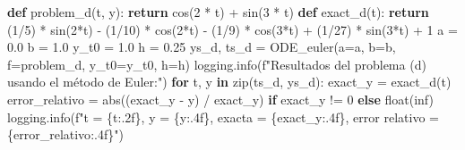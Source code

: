 \documentclass[
  letterpaper,
  DIV=11,
  numbers=noendperiod]{scrartcl}
\newenvironment{Shaded}{\begin{snugshade}}{\end{snugshade}}
\newcommand{\BuiltInTok}[1]{\textcolor[rgb]{0.00,0.23,0.31}{#1}}
\newcommand{\ControlFlowTok}[1]{\textcolor[rgb]{0.00,0.23,0.31}{\textbf{#1}}}
\newcommand{\DecValTok}[1]{\textcolor[rgb]{0.68,0.00,0.00}{#1}}
\newcommand{\FloatTok}[1]{\textcolor[rgb]{0.68,0.00,0.00}{#1}}
\newcommand{\KeywordTok}[1]{\textcolor[rgb]{0.00,0.23,0.31}{\textbf{#1}}}
\newcommand{\NormalTok}[1]{\textcolor[rgb]{0.00,0.23,0.31}{#1}}
\newcommand{\OperatorTok}[1]{\textcolor[rgb]{0.37,0.37,0.37}{#1}}
\newcommand{\SpecialCharTok}[1]{\textcolor[rgb]{0.37,0.37,0.37}{#1}}
\newcommand{\SpecialStringTok}[1]{\textcolor[rgb]{0.13,0.47,0.30}{#1}}
\newcommand{\StringTok}[1]{\textcolor[rgb]{0.13,0.47,0.30}{#1}}
\begin{document}
\begin{Shaded}
\begin{Highlighting}[]
\KeywordTok{def}\NormalTok{ problem\_d(t, y):}
    \ControlFlowTok{return}\NormalTok{ cos(}\DecValTok{2} \OperatorTok{*}\NormalTok{ t) }\OperatorTok{+}\NormalTok{ sin(}\DecValTok{3} \OperatorTok{*}\NormalTok{ t)}
\KeywordTok{def}\NormalTok{ exact\_d(t):}
    \ControlFlowTok{return}\NormalTok{ (}\DecValTok{1}\OperatorTok{/}\DecValTok{5}\NormalTok{) }\OperatorTok{*}\NormalTok{ sin(}\DecValTok{2}\OperatorTok{*}\NormalTok{t) }\OperatorTok{{-}}\NormalTok{ (}\DecValTok{1}\OperatorTok{/}\DecValTok{10}\NormalTok{) }\OperatorTok{*}\NormalTok{ cos(}\DecValTok{2}\OperatorTok{*}\NormalTok{t) }\OperatorTok{{-}}\NormalTok{ (}\DecValTok{1}\OperatorTok{/}\DecValTok{9}\NormalTok{) }\OperatorTok{*}\NormalTok{ cos(}\DecValTok{3}\OperatorTok{*}\NormalTok{t) }\OperatorTok{+}\NormalTok{ (}\DecValTok{1}\OperatorTok{/}\DecValTok{27}\NormalTok{) }\OperatorTok{*}\NormalTok{ sin(}\DecValTok{3}\OperatorTok{*}\NormalTok{t) }\OperatorTok{+} \DecValTok{1}
\NormalTok{a }\OperatorTok{=} \FloatTok{0.0}
\NormalTok{b }\OperatorTok{=} \FloatTok{1.0}
\NormalTok{y\_t0 }\OperatorTok{=} \FloatTok{1.0}
\NormalTok{h }\OperatorTok{=} \FloatTok{0.25}
\NormalTok{ys\_d, ts\_d }\OperatorTok{=}\NormalTok{ ODE\_euler(a}\OperatorTok{=}\NormalTok{a, b}\OperatorTok{=}\NormalTok{b, f}\OperatorTok{=}\NormalTok{problem\_d, y\_t0}\OperatorTok{=}\NormalTok{y\_t0, h}\OperatorTok{=}\NormalTok{h)}
\NormalTok{logging.info(}\SpecialStringTok{f"Resultados del problema (d) usando el método de Euler:"}\NormalTok{)}
\ControlFlowTok{for}\NormalTok{ t, y }\KeywordTok{in} \BuiltInTok{zip}\NormalTok{(ts\_d, ys\_d):}
\NormalTok{    exact\_y }\OperatorTok{=}\NormalTok{ exact\_d(t)}
\NormalTok{    error\_relativo }\OperatorTok{=} \BuiltInTok{abs}\NormalTok{((exact\_y }\OperatorTok{{-}}\NormalTok{ y) }\OperatorTok{/}\NormalTok{ exact\_y) }\ControlFlowTok{if}\NormalTok{ exact\_y }\OperatorTok{!=} \DecValTok{0} \ControlFlowTok{else} \BuiltInTok{float}\NormalTok{(}\StringTok{\textquotesingle{}inf\textquotesingle{}}\NormalTok{)}
\NormalTok{    logging.info(}\SpecialStringTok{f"t = }\SpecialCharTok{\{}\NormalTok{t}\SpecialCharTok{:.2f\}}\SpecialStringTok{, y = }\SpecialCharTok{\{}\NormalTok{y}\SpecialCharTok{:.4f\}}\SpecialStringTok{, exacta = }\SpecialCharTok{\{}\NormalTok{exact\_y}\SpecialCharTok{:.4f\}}\SpecialStringTok{, error relativo = }\SpecialCharTok{\{}\NormalTok{error\_relativo}\SpecialCharTok{:.4f\}}\SpecialStringTok{"}\NormalTok{)}
\end{Highlighting}
\end{Shaded}
\end{document}
